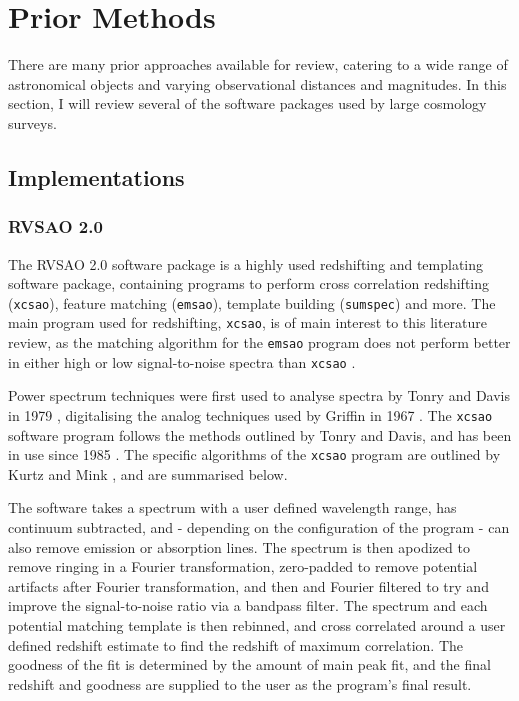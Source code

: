 \documentclass[titlesmallcaps, examinerscopy, copyrightpage]{uqthesis}
\begin{document}
\chapter{Prior Methods}
\label{ch:prior}

There are many prior approaches available for review, catering to a wide range of astronomical objects and varying observational distances and magnitudes. In this section, I will review several of the software packages used by large cosmology surveys.

\section{Implementations}

\subsection{RVSAO 2.0}

The RVSAO 2.0 software package is a highly used redshifting and templating software package, containing programs to perform cross correlation redshifting (\verb+xcsao+), feature matching (\verb+emsao+), template building (\verb+sumspec+) and more. The main program used for redshifting, \verb+xcsao+, is of main interest to this literature review, as the matching algorithm for the \verb+emsao+ program does not perform better in either high or low signal-to-noise spectra than \verb+xcsao+ \cite{kurtz1998rvsao}.

Power spectrum techniques were first used to analyse spectra by Tonry and Davis in 1979 \cite{tonry1979survey}, digitalising the analog techniques used by Griffin in 1967 \cite{griffin1967photoelectric}. The \verb+xcsao+ software program follows the methods outlined by Tonry and Davis, and has been in use since 1985 \cite{kurtz1998rvsao}. The specific algorithms of the \verb+xcsao+ program are outlined by Kurtz and Mink \cite{kurtz1998rvsao}, and are summarised below.

The software takes a spectrum with a user defined wavelength range, has continuum subtracted, and - depending on the configuration of the program - can also remove emission or absorption lines. The spectrum is then apodized to remove ringing in a Fourier transformation, zero-padded to remove potential artifacts after Fourier transformation, and then and Fourier filtered to try and improve the signal-to-noise ratio via a bandpass filter. The spectrum and each potential matching template is then rebinned, and cross correlated around a user defined redshift estimate to find the redshift of maximum correlation. The goodness of the fit is determined by the amount of main peak fit, and the final redshift and goodness are supplied to the user as the program's final result.
\end{document}

